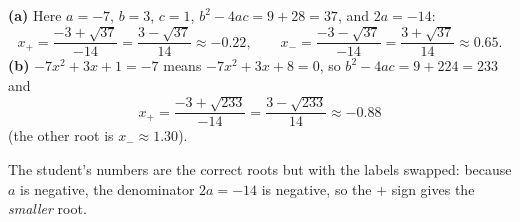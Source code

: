 \textbf{(a)} Here $a=-7$, $b=3$, $c=1$, $b^2-4ac=9+28=37$, and $2a=-14$:
\[
x_+=\dfrac{-3+\sqrt{37}}{-14}=\dfrac{3-\sqrt{37}}{14}\approx\boxed{-0.22},\qquad x_-=\dfrac{-3-\sqrt{37}}{-14}=\dfrac{3+\sqrt{37}}{14}\approx\boxed{0.65}.
\]
\textbf{(b)} $-7x^2+3x+1=-7$ means $-7x^2+3x+8=0$, so $b^2-4ac=9+224=233$ and
\[
x_+=\dfrac{-3+\sqrt{233}}{-14}=\dfrac{3-\sqrt{233}}{14}\approx\boxed{-0.88}
\]
(the other root is $x_-\approx1.30$).

The student's numbers are the correct roots but with the labels swapped: because $a$ is negative, the denominator $2a=-14$ is negative, so the $+$ sign gives the \emph{smaller} root.
